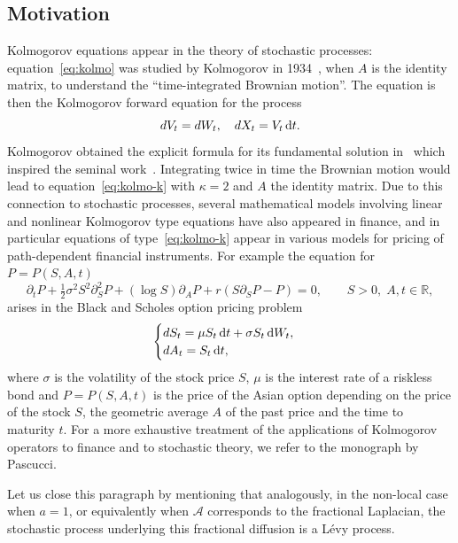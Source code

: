 \documentclass[10pt,a4paper]{amsart}
\theoremstyle{definition}
\newcommand{\dd}{{\, \mathrm d}}
\let\s\sigma
\let\p\partial
\begin{document}
\subsection{Motivation}
\label{sub-motivation}

Kolmogorov equations appear in the theory of stochastic
processes: equation~\eqref{eq:kolmo} was studied by
Kolmogorov in 1934~\cite{kolmogorov}, when $A$ is the identity
matrix, to understand the ``time-integrated Brownian motion''. The
equation is then the Kolmogorov forward equation for the
process
\begin{equation*}
{\rm d} V_t = {\rm d} W_{t}, \quad
{\rm d} X_t = V_{t} \dd t.
\end{equation*}
Kolmogorov obtained the explicit formula for its fundamental solution
in~\cite{kolmogorov} which inspired the seminal
work~\cite{MR0222474}. Integrating twice in time the Brownian motion
would lead to equation~\eqref{eq:kolmo-k} with $\kappa=2$ and $A$
the identity matrix. Due to this connection to stochastic
processes, several mathematical models involving linear and nonlinear Kolmogorov type equations have also appeared in finance, and in particular equations of
type~\eqref{eq:kolmo-k} appear in various models for pricing of
path-dependent financial instruments. For
example the equation for $P=P(S,A,t)$
\begin{equation}
\label{bpv}
\p_t P + \tfrac12 \s^{2} S^2 \p^2_S P + (\log S) \p_{A} P + r
(S \p_{S} P - P) = 0, \qquad S > 0,
\; A, t \in \mathbb{R},
\end{equation}
arises in the Black and Scholes option pricing problem
\begin{equation*}
\begin{cases}
{\rm d} S_t = \mu S_{t} \dd t + \s S_{t} \dd W_{t}, \\
{\rm d} A_t = S_{t} \dd t,
\end{cases}
\end{equation*}
where $\s$ is the volatility of the stock price $S$, $\mu$ is the
interest rate of a riskless bond and $P= P(S, A, t)$ is the price
of the Asian option depending on the price of the stock $S$, the
geometric average $A$ of the past price and the time to maturity
$t$. For a more exhaustive treatment of the applications of
Kolmogorov operators to finance and to stochastic theory, we
refer to the monograph \cite{Pascucci} by Pascucci.

Let us close this paragraph by mentioning that analogously,
in the non-local case when $a = 1$,
or equivalently when $\mathcal A$ corresponds to
the fractional Laplacian, the stochastic
process underlying this fractional diffusion is a Lévy process.
\end{document}
